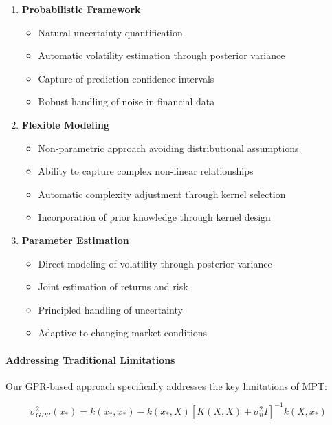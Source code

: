 \begin{enumerate}
    \item \textbf{Probabilistic Framework}
    \begin{itemize}
        \item Natural uncertainty quantification
        \item Automatic volatility estimation through posterior variance
        \item Capture of prediction confidence intervals
        \item Robust handling of noise in financial data
    \end{itemize}

    \item \textbf{Flexible Modeling}
    \begin{itemize}
        \item Non-parametric approach avoiding distributional assumptions
        \item Ability to capture complex non-linear relationships
        \item Automatic complexity adjustment through kernel selection
        \item Incorporation of prior knowledge through kernel design
    \end{itemize}

    \item \textbf{Parameter Estimation}
    \begin{itemize}
        \item Direct modeling of volatility through posterior variance
        \item Joint estimation of returns and risk
        \item Principled handling of uncertainty
        \item Adaptive to changing market conditions
    \end{itemize}
\end{enumerate}

\paragraph{Addressing Traditional Limitations}
Our GPR-based approach specifically addresses the key limitations of MPT:

\begin{equation}
    \sigma_{GPR}^2(x_*) = k(x_*, x_*) - k(x_*, X)[K(X,X) + \sigma_n^2I]^{-1}k(X, x_*)
    \label{eq:gpr_variance}
\end{equation}

